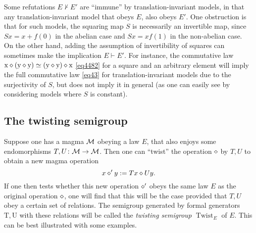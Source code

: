   Some refutations $E \not \vdash E'$ are ``immune'' by translation-invariant models, in that any translation-invariant model that obeys $E$, also obeys $E'$.  One obstruction is that for such models, the squaring map $S$ is necessarily an invertible map, since $Sx = x + f(0)$ in the abelian case and $Sx = xf(1)$ in the non-abelian case. On the other hand, adding the assumption of invertibility of squares can sometimes make the implication $E \vdash E'$.  For instance, the commutative law $\mathrm{x} \diamond (\mathrm{y} \diamond \mathrm{y}) \simeq (\mathrm{y} \diamond \mathrm{y}) \diamond \mathrm{x}$ \eqref{eq4482} for a square and an arbitrary element will imply the full commutative law \eqref{eq43} for translation-invariant models due to the surjectivity of $S$, but does not imply it in general (as one can easily see by considering models where $S$ is constant).

\subsection{The twisting semigroup}\label{twisting-sec}

Suppose one has a magma ${\mathcal{M}}$ obeying a law $E$, that also enjoys some endomorphisms $T, U \colon {\mathcal{M}} \to {\mathcal{M}}$.  Then one can ``twist'' the operation $\diamond$ by $T,U$ to obtain a new magma operation
\begin{equation}\label{twist} x \diamond' y := Tx \diamond Uy.
\end{equation}
If one then tests whether this new operation $\diamond'$ obeys the same law $E$ as the original operation $\diamond$, one will find that this will be the case provided that $T,U$ obey a certain set of relations.  The semigroup generated by formal generators $\mathrm{T}, \mathrm{U}$ with these relations will be called the \emph{twisting semigroup} $\operatorname{Twist}_E$ of $E$.  This can be best illustrated with some examples.

